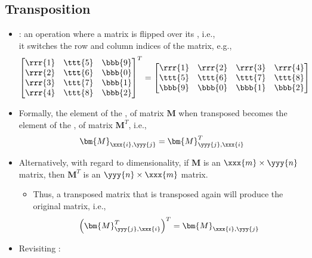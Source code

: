 \begin{itemize}
  \subsection{Transposition}\label{Transposition}
  \begin{itemize}
    \item {}: an operation where a matrix is flipped over its \hyperref[Diagonal]{}, i.e., \\ it switches the row and column indices of the matrix, e.g., 
    \[%
    \begin{bmatrix}
    \rrr{1} & \ttt{5} & \bbb{9} \\
    \rrr{2} & \ttt{6} & \bbb{0} \\
    \rrr{3} & \ttt{7} & \bbb{1} \\
    \rrr{4} & \ttt{8} & \bbb{2}
    \end{bmatrix}^T
    =
    \begin{bmatrix}
    \rrr{1} & \rrr{2} & \rrr{3} & \rrr{4} \\
    \ttt{5} & \ttt{6} & \ttt{7} & \ttt{8} \\
    \bbb{9} & \bbb{0} & \bbb{1} & \bbb{2}
    \end{bmatrix}
    \]%
    \item Formally, the element of the ,  of matrix \(\bm{M}\) when transposed becomes the element of the ,  of matrix \(\bm{M}^T\), i.e.,
    \[%
    \bm{M}_{\xxx{i},\yyy{j}} = \bm{M}_{\yyy{j},\xxx{i}}^T
    \]%
    \item Alternatively, with regard to dimensionality, if \(\bm{M}\) is an \(\xxx{m} \times \yyy{n}\) matrix, then \(\bm{M}^T\) is an \(\yyy{n} \times \xxx{m}\) matrix. 
      \begin{itemize}
        \item Thus, a transposed matrix that is transposed again will produce the original matrix, i.e.,
        \[%
        \left(\bm{M}_{\yyy{j},\xxx{i}}^T\right)^T = \bm{M}_{\xxx{i},\yyy{j}} %
        \]%
      \end{itemize}
    \item Revisiting \hyperref[Augmented and Complex Matrices]{}:
    \begin{itemize}

\end{itemize}
\end{itemize}
\end{itemize}
